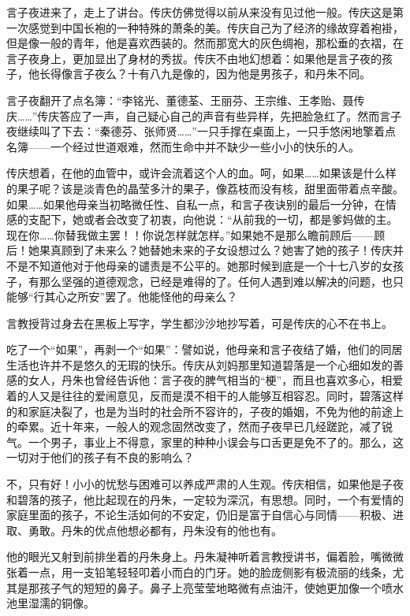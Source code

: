 \par 言子夜进来了，走上了讲台。传庆仿佛觉得以前从来没有见过他一般。传庆这是第一次感觉到中国长袍的一种特殊的萧条的美。传庆自己为了经济的缘故穿着袍褂，但是像一般的青年，他是喜欢西装的。然而那宽大的灰色绸袍，那松垂的衣褶，在言子夜身上，更加显出了身材的秀拔。传庆不由地幻想着：如果他是言子夜的孩子，他长得像言子夜么？十有八九是像的，因为他是男孩子，和丹朱不同。
\par 言子夜翻开了点名簿：“李铭光、董德荃、王丽芬、王宗维、王孝贻、聂传庆……”传庆答应了一声，自己疑心自己的声音有些异样，先把脸急红了。然而言子夜继续叫了下去：“秦德芬、张师贤……”一只手撑在桌面上，一只手悠闲地擎着点名簿——一个经过世道艰难，然而生命中并不缺少一些小小的快乐的人。
\par 传庆想着，在他的血管中，或许会流着这个人的血。呵，如果……如果该是什么样的果子呢？该是淡青色的晶莹多汁的果子，像荔枝而没有核，甜里面带着点辛酸。如果……如果他母亲当初略微任性、自私一点，和言子夜诀别的最后一分钟，在情感的支配下，她或者会改变了初衷，向他说：“从前我的一切，都是爹妈做的主。现在你……你替我做主罢！！你说怎样就怎样。”如果她不是那么瞻前顾后——顾后！她果真顾到了未来么？她替她未来的子女设想过么？她害了她的孩子！传庆并不是不知道他对于他母亲的谴责是不公平的。她那时候到底是一个十七八岁的女孩子，有那么坚强的道德观念，已经是难得的了。任何人遇到难以解决的问题，也只能够“行其心之所安”罢了。他能怪他的母亲么？
\par 言教授背过身去在黑板上写字，学生都沙沙地抄写着，可是传庆的心不在书上。
\par 吃了一个“如果”，再剥一个“如果”：譬如说，他母亲和言子夜结了婚，他们的同居生活也许并不是悠久的无瑕的快乐。传庆从刘妈那里知道碧落是一个心细如发的善感的女人，丹朱也曾经告诉他：言子夜的脾气相当的“梗”，而且也喜欢多心，相爱着的人又是往往的爱闹意见，反而是漠不相干的人能够互相容忍。同时，碧落这样的和家庭决裂了，也是为当时的社会所不容许的，子夜的婚姻，不免为他的前途上的牵累。近十年来，一般人的观念固然改变了，然而子夜早已几经蹉跎，减了锐气。一个男子，事业上不得意，家里的种种小误会与口舌更是免不了的。那么，这一切对于他们的孩子有不良的影响么？
\par 不，只有好！小小的忧愁与困难可以养成严肃的人生观。传庆相信，如果他是子夜和碧落的孩子，他比起现在的丹朱，一定较为深沉，有思想。同时，一个有爱情的家庭里面的孩子，不论生活如何的不安定，仍旧是富于自信心与同情——积极、进取、勇敢。丹朱的优点他想必都有，丹朱没有的他也有。
\par 他的眼光又射到前排坐着的丹朱身上。丹朱凝神听着言教授讲书，偏着脸，嘴微微张着一点，用一支铅笔轻轻叩着小而白的门牙。她的脸庞侧影有极流丽的线条，尤其是那孩子气的短短的鼻子。鼻子上亮莹莹地略微有点油汗，使她更加像一个喷水池里湿濡的铜像。
